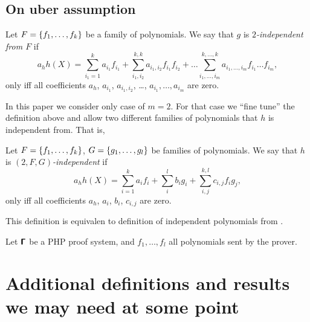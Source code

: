 \documentclass[runningheads,11pt]{llncs}
\begin{document}
\subsection{On uber assumption}
\begin{definition}
  Let $F = \{f_1, \ldots, f_k\}$ be a family of polynomials. We say that $g$ is \emph{$2$-independent
    from $F$} if
  \[
    a_h h(X) = \sum_{i_1 = 1}^{k} a_{i_1} f_{i_1} + \sum_{i_1, i_2}^{k, k} a_{i_1, i_2}
    f_{i_1} f_{i_2} + \ldots \sum_{i_1, \ldots, i_m}^{k, \ldots, k} a_{i_1,
      \ldots, i_m} f_{i_1} \ldots f_{i_m},
  \]
  only iff all coefficients $a_h$, $a_{i_1}$, $a_{i_1, i_2}$, \ldots, $a_{i_1},
  \ldots, a_{i_m}$ are zero. 
\end{definition}

In this paper we consider only case of $m = 2$. For that case we ``fine tune''
the definition above and allow two different families of polynomials that $h$ is
independent from. That is,

\begin{definition}
  Let $F = \{f_1, \ldots, f_k\}$, $G = \{g_1, \ldots, g_l\}$ be
  families of polynomials. We say that $h$ is \emph{$(2, F, G)$-independent} if
  \[
    a_h h(X) = \sum_{i = 1}^{k} a_{i} f_{i} + \sum_{i}^l b_{i} g_i + \sum_{i, j}^{k, l} c_{i, j}
    f_{i} g_{j},
  \]
  only iff all coefficients $a_h$, $a_{i}$, $b_i$, $c_{i, j}$ are zero. 
\end{definition}
This definition is equivalen to definition of independent polynomials from
\cite{PAIRING:Boyen08}.

\begin{definition}
  Let $\bm{\mathsf{\Gamma}}$ be a PHP proof system, and $f_1, \ldots, f_l$ all polynomials sent
  by the prover. 
\end{definition}

\section{Additional definitions and results we may need at some point}
\end{document}
